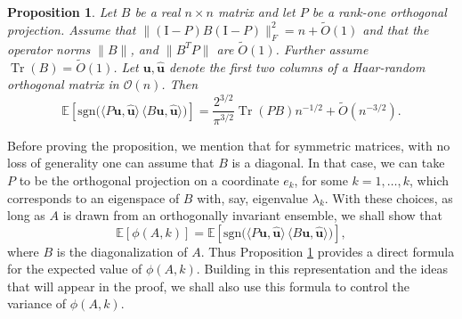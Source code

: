 \documentclass[reqno]{amsart}
\numberwithin{equation}{section}
\newcommand\E{\mathbb{E}}
\newcommand\bu{\bm{u}}
\newcommand\hu{\hat{\bm u}}
\newcommand\Tr{{\operatorname{Tr}}}
\newtheorem{proposition}[theorem]{Proposition}
\begin{document}
\begin{proposition}\label{prop:main_prop}
Let $B$ be a real $n\times n$ matrix and let $P$ be a rank-one orthogonal projection.
Assume that $\|(\mathrm{I}-P)B(\mathrm{I}-P)\|_{F}^2=n+\tilde{O}(1)$ and that the operator norms
$\|B\|$, and $\|B^{T}P\|$ are $\tilde{O}(1)$. Further assume $\Tr(B)=\tilde{O}(1)$.
Let $\bu,\hu$ denote the first two columns of a Haar-random orthogonal matrix in $\mathcal{O}(n)$. Then
\[
\E\!\left[\mathrm{sgn}\!\big(\langle P\bu,\hu\rangle\,
\langle B\bu,\hu\rangle\big)\right]
=\frac{2^{3/2}}{\pi^{3/2}}\Tr(PB)n^{-1/2}+\tilde{O}(n^{-3/2}).
\]
\end{proposition}
Before proving the proposition, we mention that for symmetric matrices, with no loss of generality one can assume that $B$ is a diagonal. In that case, we can take $P$ to be the orthogonal projection on a coordinate $e_k$, for some $k = 1,\dots,k$, which corresponds to an eigenspace of $B$ with, say, eigenvalue $\lambda_k$. With these choices, as long as $A$ is drawn from an orthogonally invariant ensemble, we shall show that
$$\E[\phi(A,k)] = \E\left[\mathrm{sgn}\!\big(\langle P\bu,\hu\rangle\,
\langle B\bu,\hu\rangle\big)\right],$$
where $B$ is the diagonalization of $A$. Thus Proposition \ref{prop:main_prop} provides a direct formula for the expected value of $\phi(A,k)$. Building in this representation and the ideas that will appear in the proof, we shall also use this formula to control the variance of $\phi(A,k)$.
\end{document}
